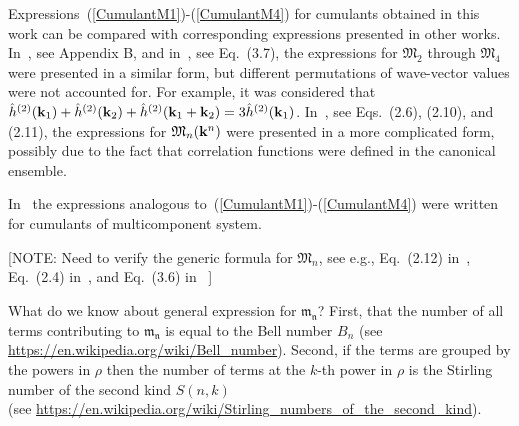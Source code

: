 Expressions~(\ref{CumulantM1})-(\ref{CumulantM4}) for cumulants obtained in this work can be compared with corresponding expressions presented in other works.
In~\cite{YukhJSP1995}, see Appendix B, and in~\cite{Idzik1987En}, see Eq.~(3.7), the expressions for $\mathfrak{M}_2$ through $\mathfrak{M}_4$ were presented in a similar form, but different permutations of wave-vector values were not accounted for. For example, it was considered that $\hat{h}^{(2)}(\vb k_1) + \hat{h}^{(2)}(\vb k_2) + \hat{h}^{(2)}(\vb k_1 + \vb k_2) = 3\hat{h}^{(2)}(\vb k_1)$.
In~\cite{Yukh1989tmpEn}, see Eqs.~(2.6), (2.10), and (2.11), the expressions for $\mathfrak{M}_n(\vb k^n)$ were presented in a more complicated form, possibly due to the fact that correlation functions were defined in the canonical ensemble.

In~\cite{Pats1990tmf} the expressions analogous to~(\ref{CumulantM1})-(\ref{CumulantM4}) were written for cumulants of multicomponent system.


[NOTE: Need to verify the generic formula for $\mathfrak M_n$, see e.g., Eq.~(2.12) in~\cite{Yukh1990}, Eq.~(2.4) in~\cite{Yukh1989tmpEn}, and Eq.~(3.6) in ~\cite{Idzik1987En}]

What do we know about general expression for $\mathfrak{m_n}$? First, that the number of all terms contributing to $\mathfrak{m_n}$ is equal to the Bell number $B_n$ (see
\href{https://en.wikipedia.org/wiki/Bell_number}{https://en.wikipedia.org/wiki/Bell\_number}). Second, if the terms are grouped by the powers in $\rho$ then the number of terms at the $k$-th power in $\rho$ is the Stirling number of the second kind $S(n,k)$ 
\\(see \href{https://en.wikipedia.org/wiki/Stirling_numbers_of_the_second_kind}{https://en.wikipedia.org/wiki/Stirling\_numbers\_of\_the\_second\_kind}).

